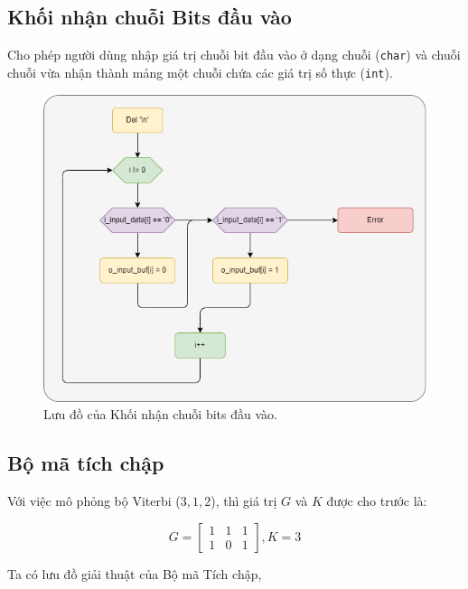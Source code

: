 \subsection{Khối nhận chuỗi Bits đầu vào}

Cho phép người dùng nhập giá trị chuỗi bit đầu vào ở dạng chuỗi (\texttt{char}) và chuỗi chuỗi vừa nhận thành mảng một chuỗi chứa các giá trị số thực (\texttt{int}).

\begin{figure}[H]
	\centering
	\includegraphics[width=.44\linewidth]{sections/pic/mophongbangC/Trans_string_to_binary.png}
	\caption{Lưu đồ của Khối nhận chuỗi bits đầu vào.}
\end{figure}


\subsection{Bộ mã tích chập}

Với việc mô phỏng bộ Viterbi ($3, 1, 2$), thì giá trị $G$ và $K$ được cho trước là:

\[
	G = \begin{bmatrix}
		1 & 1 & 1\\
		1 & 0 & 1
	\end{bmatrix}, K = 3
\]

Ta có lưu đồ giải thuật của Bộ mã Tích chập,

